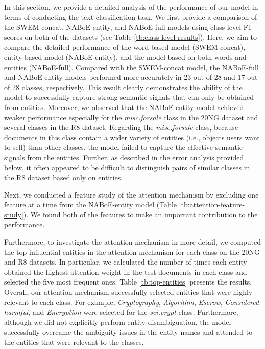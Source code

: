 \documentclass[11pt,a4paper]{article}
\begin{document}
    In this section, we provide a detailed analysis of the performance of our model in terms of conducting the text classification task.
    We first provide a comparison of the SWEM-concat, NABoE-entity, and NABoE-full models using class-level F1 scores on both of the datasets (see Table \ref{tb:class-level-results}).
    Here, we aim to compare the detailed performance of the word-based model (SWEM-concat), entity-based model (NABoE-entity), and the model based on both words and entities (NABoE-full).
    Compared with the SWEM-concat model, the NABoE-full and NABoE-entity models performed more accurately in 23 out of 28 and 17 out of 28 classes, respectively.
    This result clearly demonstrates the ability of the model to successfully capture strong semantic signals that can only be obtained from entities.
    Moreover, we observed that the NABoE-entity model achieved weaker performance especially for the \textit{misc.forsale} class in the 20NG dataset and several classes in the R8 dataset.
    Regarding the \textit{misc.forsale} class, because documents in this class contain a wider variety of entities (i.e., objects users want to sell) than other classes, the model failed to capture the effective semantic signals from the entities.
    Further, as described in the error analysis provided below, it often appeared to be difficult to distinguish pairs of similar classes in the R8 dataset based only on entities.

    Next, we conducted a feature study of the attention mechanism by excluding one feature at a time from the NABoE-entity model (Table \ref{tb:attention-feature-study}).
    We found both of the features to make an important contribution to the performance.

    Furthermore, to investigate the attention mechanism in more detail, we computed the top influential entities in the attention mechanism for each class on the 20NG and R8 datasets.
    In particular, we calculated the number of times each entity obtained the highest attention weight in the test documents in each class and selected the five most frequent ones.
    Table \ref{tb:top-entities} presents the results.
    Overall, our attention mechanism successfully selected entities that were highly relevant to each class.
    For example, \textit{Cryptography}, \textit{Algorithm}, \textit{Escrow}, \textit{Considered harmful}, and \textit{Encryption} were selected for the \textit{sci.crypt} class.
    Furthermore, although we did not explicitly perform entity disambiguation, the model successfully overcame the ambiguity issues in the entity names and attended to the entities that were relevant to the classes.
\end{document}
